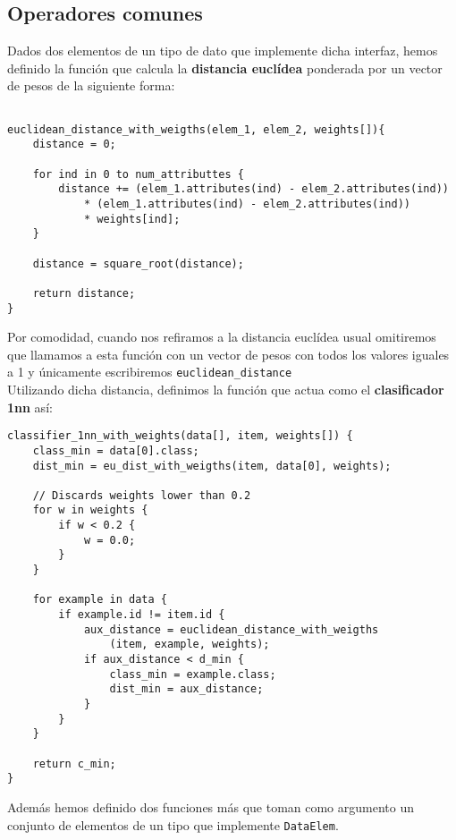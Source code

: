 \documentclass[size=a4, parskip=half, titlepage=false, toc=flat, toc=bib, 12pt]{scrartcl}
\begin{document}
\subsection{Operadores comunes}
Dados dos elementos de un tipo de dato que implemente dicha interfaz, hemos definido la función que calcula la \textbf{distancia euclídea} ponderada por un vector de pesos de la siguiente forma:

\begin{verbatim}

euclidean_distance_with_weigths(elem_1, elem_2, weights[]){
    distance = 0;

    for ind in 0 to num_attributtes {
        distance += (elem_1.attributes(ind) - elem_2.attributes(ind))
            * (elem_1.attributes(ind) - elem_2.attributes(ind))
            * weights[ind];
    }

    distance = square_root(distance);

    return distance;
}

\end{verbatim}
Por comodidad, cuando nos refiramos a la distancia euclídea usual omitiremos que llamamos a esta función con un vector de pesos con todos los valores iguales a 1 y únicamente escribiremos \texttt{euclidean\_distance} \\

Utilizando dicha distancia, definimos la función que actua como el \textbf{clasificador 1nn} así:
\begin{verbatim}
classifier_1nn_with_weights(data[], item, weights[]) {
    class_min = data[0].class;
    dist_min = eu_dist_with_weigths(item, data[0], weights);

    // Discards weights lower than 0.2
    for w in weights {
        if w < 0.2 {
            w = 0.0;
        }
    }

    for example in data {
        if example.id != item.id {
            aux_distance = euclidean_distance_with_weigths
                (item, example, weights);
            if aux_distance < d_min {
                class_min = example.class;
                dist_min = aux_distance;
            }
        }
    }

    return c_min;
}

\end{verbatim}

Además hemos definido dos funciones más que toman como argumento un conjunto de elementos de un tipo que implemente \texttt{DataElem}.\\
\end{document}
